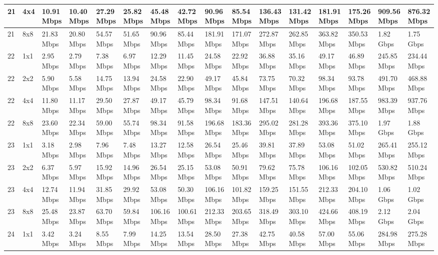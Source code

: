 \documentclass[12pt]{article}
\begin{document}
\begin{longtable}[c]{|l|l|l|l|l|l|l|l|l|l|l|l|l|l|l|l|}
21 & 4x4 & 10.91 Mbps & 10.40 Mbps & 27.29 Mbps & 25.82 Mbps & 45.48 Mbps & 42.72 Mbps & 90.96 Mbps & 85.54 Mbps & 136.43 Mbps & 131.42 Mbps & 181.91 Mbps & 175.26 Mbps & 909.56 Mbps & 876.32 Mbps \\ \hline
21 & 8x8 & 21.83 Mbps & 20.80 Mbps & 54.57 Mbps & 51.65 Mbps & 90.96 Mbps & 85.44 Mbps & 181.91 Mbps & 171.07 Mbps & 272.87 Mbps & 262.85 Mbps & 363.82 Mbps & 350.53 Mbps & 1.82 Gbps & 1.75 Gbps \\ \hline
22 & 1x1 & 2.95 Mbps & 2.79 Mbps & 7.38 Mbps & 6.97 Mbps & 12.29 Mbps & 11.45 Mbps & 24.58 Mbps & 22.92 Mbps & 36.88 Mbps & 35.16 Mbps & 49.17 Mbps & 46.89 Mbps & 245.85 Mbps & 234.44 Mbps \\ \hline
22 & 2x2 & 5.90 Mbps & 5.58 Mbps & 14.75 Mbps & 13.94 Mbps & 24.58 Mbps & 22.90 Mbps & 49.17 Mbps & 45.84 Mbps & 73.75 Mbps & 70.32 Mbps & 98.34 Mbps & 93.78 Mbps & 491.70 Mbps & 468.88 Mbps \\ \hline
22 & 4x4 & 11.80 Mbps & 11.17 Mbps & 29.50 Mbps & 27.87 Mbps & 49.17 Mbps & 45.79 Mbps & 98.34 Mbps & 91.68 Mbps & 147.51 Mbps & 140.64 Mbps & 196.68 Mbps & 187.55 Mbps & 983.39 Mbps & 937.76 Mbps \\ \hline
22 & 8x8 & 23.60 Mbps & 22.34 Mbps & 59.00 Mbps & 55.74 Mbps & 98.34 Mbps & 91.58 Mbps & 196.68 Mbps & 183.36 Mbps & 295.02 Mbps & 281.28 Mbps & 393.36 Mbps & 375.10 Mbps & 1.97 Gbps & 1.88 Gbps \\ \hline
23 & 1x1 & 3.18 Mbps & 2.98 Mbps & 7.96 Mbps & 7.48 Mbps & 13.27 Mbps & 12.58 Mbps & 26.54 Mbps & 25.46 Mbps & 39.81 Mbps & 37.89 Mbps & 53.08 Mbps & 51.02 Mbps & 265.41 Mbps & 255.12 Mbps \\ \hline
23 & 2x2 & 6.37 Mbps & 5.97 Mbps & 15.92 Mbps & 14.96 Mbps & 26.54 Mbps & 25.15 Mbps & 53.08 Mbps & 50.91 Mbps & 79.62 Mbps & 75.78 Mbps & 106.16 Mbps & 102.05 Mbps & 530.82 Mbps & 510.24 Mbps \\ \hline
23 & 4x4 & 12.74 Mbps & 11.94 Mbps & 31.85 Mbps & 29.92 Mbps & 53.08 Mbps & 50.30 Mbps & 106.16 Mbps & 101.82 Mbps & 159.25 Mbps & 151.55 Mbps & 212.33 Mbps & 204.10 Mbps & 1.06 Gbps & 1.02 Gbps \\ \hline
23 & 8x8 & 25.48 Mbps & 23.87 Mbps & 63.70 Mbps & 59.84 Mbps & 106.16 Mbps & 100.61 Mbps & 212.33 Mbps & 203.65 Mbps & 318.49 Mbps & 303.10 Mbps & 424.66 Mbps & 408.19 Mbps & 2.12 Gbps & 2.04 Gbps \\ \hline
24 & 1x1 & 3.42 Mbps & 3.24 Mbps & 8.55 Mbps & 7.99 Mbps & 14.25 Mbps & 13.54 Mbps & 28.50 Mbps & 27.38 Mbps & 42.75 Mbps & 40.58 Mbps & 57.00 Mbps & 55.06 Mbps & 284.98 Mbps & 275.28 Mbps \\ \hline

\end{longtable}
\end{document}
